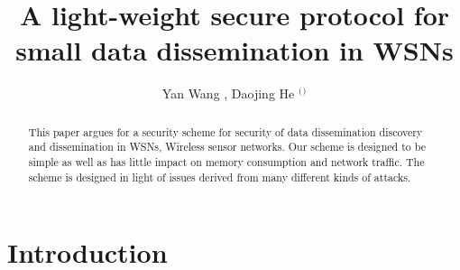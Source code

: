 \documentclass[lnicst,sechang,a4paper]{svmultln}
\begin{document}
\mainmatter  %

\title{A light-weight secure protocol for small data dissemination in WSNs}


%
%
\author{Yan Wang%
, Daojing He $^($\Envelope $^)$
}  %


%
%

\maketitle


\begin{abstract}


This paper argues for a security scheme for security of data dissemination discovery and dissemination in WSNs, Wireless sensor networks. Our scheme is designed to be simple as well as has little impact on memory consumption and network traffic. The scheme is designed in light of issues derived from many different kinds of attacks.

\end{abstract}
\section{Introduction}
\end{document}
